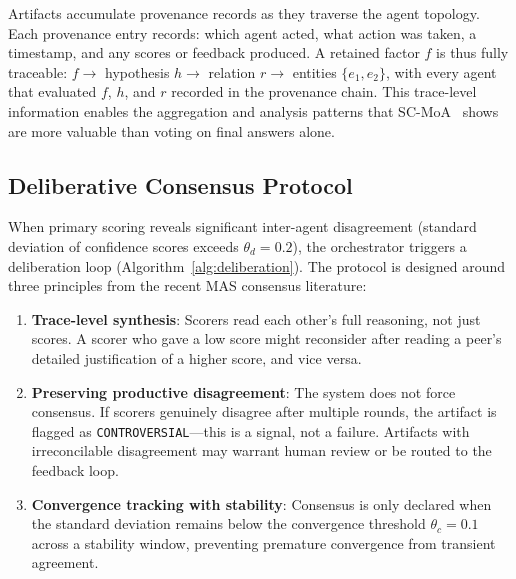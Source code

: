 \documentclass[sigconf]{acmart}
\begin{document}
Artifacts accumulate provenance records as they traverse the agent topology. Each provenance entry records: which agent acted, what action was taken, a timestamp, and any scores or feedback produced. A retained factor $f$ is thus fully traceable: $f \rightarrow$ hypothesis $h \rightarrow$ relation $r \rightarrow$ entities $\{e_1, e_2\}$, with every agent that evaluated $f$, $h$, and $r$ recorded in the provenance chain. This trace-level information enables the aggregation and analysis patterns that SC-MoA~\cite{ghafarollahi2024sciagents} shows are more valuable than voting on final answers alone.

\subsection{Deliberative Consensus Protocol}

When primary scoring reveals significant inter-agent disagreement (standard deviation of confidence scores exceeds $\theta_d = 0.2$), the orchestrator triggers a deliberation loop (Algorithm~\ref{alg:deliberation}). The protocol is designed around three principles from the recent MAS consensus literature:

\begin{enumerate}
    \item \textbf{Trace-level synthesis}: Scorers read each other's full reasoning, not just scores. A scorer who gave a low score might reconsider after reading a peer's detailed justification of a higher score, and vice versa.
    \item \textbf{Preserving productive disagreement}: The system does not force consensus. If scorers genuinely disagree after multiple rounds, the artifact is flagged as \texttt{CONTROVERSIAL}---this is a signal, not a failure. Artifacts with irreconcilable disagreement may warrant human review or be routed to the feedback loop.
    \item \textbf{Convergence tracking with stability}: Consensus is only declared when the standard deviation remains below the convergence threshold $\theta_c = 0.1$ across a stability window, preventing premature convergence from transient agreement.
\end{enumerate}
\end{document}
